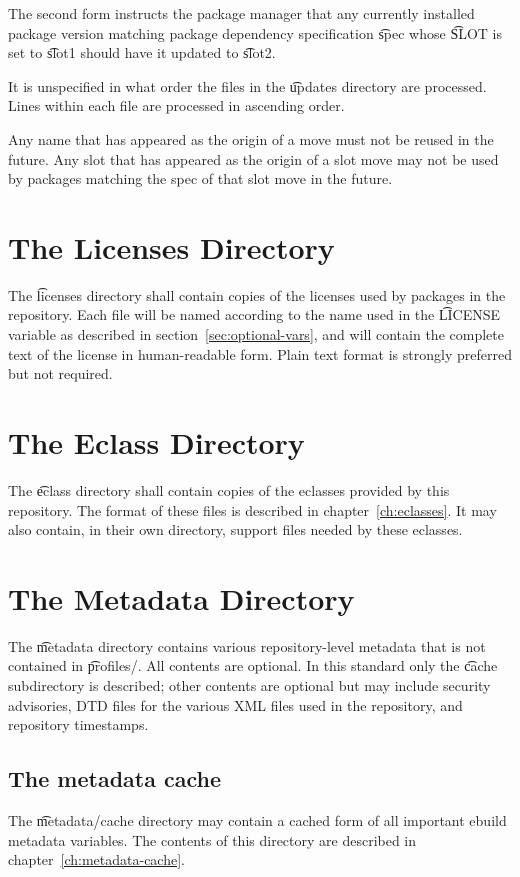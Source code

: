 The second form instructs the package manager that any currently installed package version matching
package dependency specification \t{spec} whose \t{SLOT} is set to \t{slot1} should have it updated
to \t{slot2}.

It is unspecified in what order the files in the \t{updates} directory are processed. Lines within
each file are processed in ascending order.

Any name that has appeared as the origin of a move must not be reused in the future. Any slot
that has appeared as the origin of a slot move may not be used by packages matching the spec of
that slot move in the future.

\section{The Licenses Directory}
\label{sec:licenses-dir}

The \t{licenses} directory shall contain copies of the licenses used by packages in the
repository. Each file will be named according to the name used in the \t{LICENSE} variable as
described in section~\ref{sec:optional-vars}, and will contain the complete text of the license in
human-readable form. Plain text format is strongly preferred but not required.

\section{The Eclass Directory}
\label{sec:eclass-dir}

The \t{eclass} directory shall contain copies of the eclasses provided by this repository. The
format of these files is described in chapter~\ref{ch:eclasses}. It may also contain, in their own
directory, support files needed by these eclasses.

\section{The Metadata Directory}
\label{sec:metadata-dir}

The \t{metadata} directory contains various repository-level metadata that is not contained in
\t{profiles/}. All contents are optional. In this standard only the \t{cache} subdirectory is
described; other contents are optional but may include security advisories, DTD files for the
various XML files used in the repository, and repository timestamps.

\subsection{The metadata cache}

The \t{metadata/cache} directory may contain a cached form of all important ebuild metadata
variables. The contents of this directory are described in chapter~\ref{ch:metadata-cache}.


